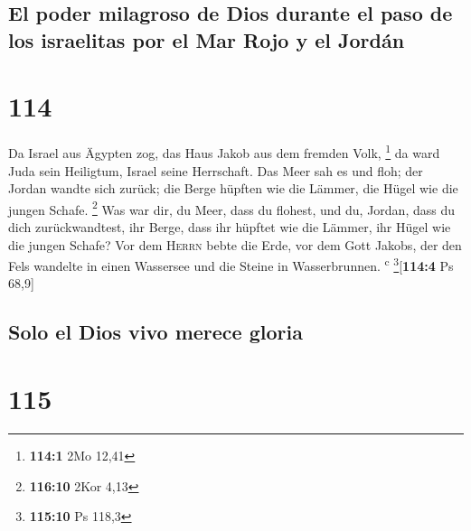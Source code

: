 \hypertarget{el-poder-milagroso-de-dios-durante-el-paso-de-los-israelitas-por-el-mar-rojo-y-el-jorduxe1n}{%
\subsection{El poder milagroso de Dios durante el paso de los israelitas
por el Mar Rojo y el
Jordán}\label{el-poder-milagroso-de-dios-durante-el-paso-de-los-israelitas-por-el-mar-rojo-y-el-jorduxe1n}}

\hypertarget{section-113}{%
\section{114}\label{section-113}}

 Da Israel aus Ägypten zog, das Haus Jakob aus dem fremden
Volk, \footnote{\textbf{114:1} 2Mo 12,41}  da ward Juda
sein Heiligtum, Israel seine Herrschaft.  Das Meer sah es
und floh; der Jordan wandte sich zurück;  die Berge
hüpften wie die Lämmer, die Hügel wie die jungen Schafe. \footnote{\textbf{116:10}
  2Kor 4,13}  Was war dir, du Meer, dass du flohest, und
du, Jordan, dass du dich zurückwandtest,  ihr Berge, dass
ihr hüpftet wie die Lämmer, ihr Hügel wie die jungen Schafe?
 Vor dem \textsc{Herrn} bebte die Erde, vor dem Gott
Jakobs,  der den Fels wandelte in einen Wassersee und die
Steine in Wasserbrunnen. \textsuperscript{c}
\footnote{\textbf{115:10} Ps 118,3}{[}\textbf{114:4} Ps 68,9{]}

\hypertarget{solo-el-dios-vivo-merece-gloria}{%
\subsection{Solo el Dios vivo merece
gloria}\label{solo-el-dios-vivo-merece-gloria}}

\hypertarget{section-114}{%
\section{115}\label{section-114}}

